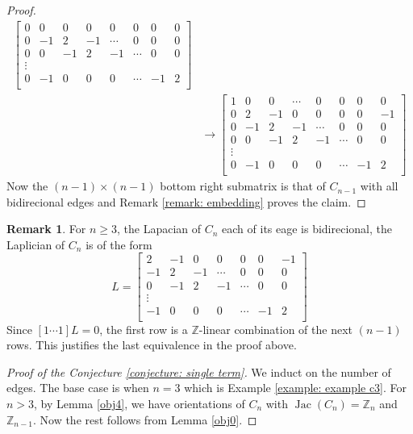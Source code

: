 \documentclass[11pt,reqno]{amsart}
\DeclareMathOperator{\Jac}{Jac}
\newcommand{\Z}{\mathbb{Z}}
\theoremstyle{definition}
\newtheorem{rmk}[mydef]{Remark}
\theoremstyle{plain}
\begin{document}
\begin{proof}
\begin{align}
\begin{bmatrix}
				0 & 0 & 0 & 0 & 0 & 0 & 0 & 0   \\
				0 & -1 & 2 & -1 & \cdots & 0 & 0 & 0 \\
				0 & 0 & -1 & 2 & -1 & \cdots & 0 & 0  \\
				\vdots \\
				0 & -1 & 0 & 0 & 0 & \cdots & -1 & 2 \\
			\end{bmatrix}\\
			&\to\begin{bmatrix}
				1 & 0 & 0 & \cdots & 0 & 0 & 0 & 0 \\
				0 & 2 & -1 & 0 & 0 & 0 & 0 & -1   \\
				0 & -1 & 2 & -1 & \cdots & 0 & 0 & 0 \\
				0 & 0 & -1 & 2 & -1 & \cdots & 0 & 0  \\
				\vdots \\
				0 & -1 & 0 & 0 & 0 & \cdots & -1 & 2 \\
			\end{bmatrix} \tag{See the remark below for the last equivalance}
			\end{align}
			Now the $(n-1) \times (n-1)$ bottom right submatrix is that of $C_{n-1}$ with all bidirecional edges and Remark \ref{remark: embedding} proves the claim.
		\end{proof}

		\begin{rmk} \label{obj2}
			For $n \ge 3$, the Lapacian of $C_n$ each of its eage is bidirecional, the Laplician of $C_n$ is of the form 
			$$
			L = 
			\begin{bmatrix}
				2 & -1 & 0 & 0 & 0 & 0 & -1   \\
				-1 & 2 & -1 & \cdots & 0 & 0 & 0 \\
				0 & -1 & 2 & -1 & \cdots & 0 & 0  \\
				\vdots \\
				-1 & 0 & 0 & 0 & \cdots & -1 & 2 \\
			\end{bmatrix}
			$$
			Since $[1 \cdots 1] L = 0$, 
			the first row is a $\Z$-linear combination of the next $(n-1)$ rows. 
			This justifies the last equivalence in the proof above.  
		\end{rmk}

		\begin{proof}[Proof of the Conjecture \ref{conjecture: single term}]
		We induct on the number of edges. The base case is when $n = 3$ which is Example \ref{example: example c3}. For $n > 3$, by Lemma \ref{obj4}, we have orientations of $C_n$ with $\Jac(C_n) = \mathbb{Z}_n$ and $\mathbb{Z}_{n-1}$. 
		Now the rest follows from Lemma \ref{obj0}. 
		\end{proof}
			
\end{document}

